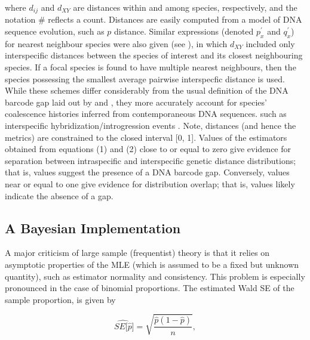 \documentclass[12pt]{article}
\begin{document}
\noindent where $d_{ij}$ and $d_{XY}$ are distances within and among species, respectively, and the notation \# reflects a count. Distances are easily computed from a model of DNA sequence evolution, such as $p$ distance. Similar expressions (denoted $p^{'}_x$ and $q^{'}_x$) for nearest neighbour species were also given (see \cite{phillips2024measure}), in which $d_{XY}$ included only interspecific distances between the species of interest and its closest neighbouring species. If a focal species is found to have multiple nearest neighbours, then the species possessing the smallest average pairwise interspecfic distance is used. While these schemes differ considerably from the usual definition of the DNA barcode gap laid out by \citet{meyer2005dna} and \citet{meier2008use}, they more accurately account for species' coalescence histories inferred from contemporaneous DNA sequences. such as interspecific hybridization/introgression events \citep{phillips2024measure}. Note, distances (and hence the metrics) are constrained to the closed interval [0, 1]. Values of the estimators obtained from equations (1) and (2) close to or equal to zero give evidence for separation between intraspecific and interspecific genetic distance distributions; that is, values suggest the presence of a DNA barcode gap. Conversely, values near or equal to one give evidence for distribution overlap; that is, values likely indicate the absence of a gap.


\subsection{A Bayesian Implementation}

A major criticism of large sample (frequentist) theory is that it relies on asymptotic properties of the MLE (which is assumed to be a fixed but unknown quantity), such as estimator normality and consistency. This problem is especially pronounced in the case of binomial proportions. The estimated Wald SE of the sample proportion, is given by 

\begin{equation}
\widehat{SE[\hat{p}}] = \sqrt{\frac{\hat{p}(1 - \hat{p})}{n}},
\end{equation}
\end{document}
